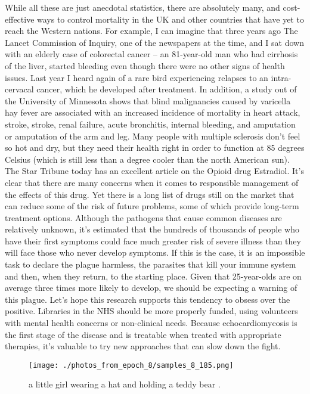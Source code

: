 \documentclass{article}%
\begin{document}
While all these are just anecdotal statistics, there are absolutely many, and cost{-}effective ways to control mortality in the UK and other countries that have yet to reach the Western nations. For example, I can imagine that three years ago The Lancet Commission of Inquiry, one of the newspapers at the time, and I sat down with an elderly case of colorectal cancer – an 81{-}year{-}old man who had cirrhosis of the liver, started bleeding even though there were no other signs of health issues. Last year I heard again of a rare bird experiencing relapses to an intra{-}cervacal cancer, which he developed after treatment. In addition, a study out of the University of Minnesota shows that blind malignancies caused by varicella hay fever are associated with an increased incidence of mortality in heart attack, stroke, stroke, renal failure, acute bronchitis, internal bleeding, and amputation or amputation of the arm and leg.\newline%
Many people with multiple sclerosis don’t feel so hot and dry, but they need their health right in order to function at 85 degrees Celsius (which is still less than a degree cooler than the north American sun). The Star Tribune today has an excellent article on the Opioid drug Estradiol. It’s clear that there are many concerns when it comes to responsible management of the effects of this drug. Yet there is a long list of drugs still on the market that can reduce some of the risk of future problems, some of which provide long{-}term treatment options.\newline%
Although the pathogens that cause common diseases are relatively unknown, it’s estimated that the hundreds of thousands of people who have their first symptoms could face much greater risk of severe illness than they will face those who never develop symptoms. If this is the case, it is an impossible task to declare the plague harmless, the parasites that kill your immune system and then, when they return, to the starting place. Given that 25{-}year{-}olds are on average three times more likely to develop, we should be expecting a warning of this plague.\newline%
Let’s hope this research supports this tendency to obsess over the positive.\newline%
Libraries in the NHS should be more properly funded, using volunteers with mental health concerns or non{-}clinical needs. Because echocardiomycosis is the first stage of the disease and is treatable when treated with appropriate therapies, it’s valuable to try new approaches that can slow down the fight.\newline%

%


\begin{figure}[h!]%
\centering%
\texttt{[image: ./photos\_from\_epoch\_8/samples\_8\_185.png]}%
\caption{a little girl wearing a hat and holding a teddy bear .}%
\end{figure}

%
\end{document}
